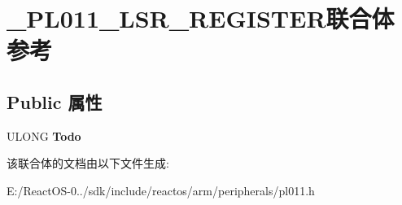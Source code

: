 \hypertarget{union___p_l011___l_s_r___r_e_g_i_s_t_e_r}{}\section{\+\_\+\+P\+L011\+\_\+\+L\+S\+R\+\_\+\+R\+E\+G\+I\+S\+T\+E\+R联合体 参考}
\label{union___p_l011___l_s_r___r_e_g_i_s_t_e_r}
\subsection*{Public 属性}
\begin{DoxyCompactItemize}
\item 
\mbox{\label{union___p_l011___l_s_r___r_e_g_i_s_t_e_r_abe5ddd438505134a40f8d96b85121261}} 
U\+L\+O\+NG {\bfseries Todo}
\end{DoxyCompactItemize}


该联合体的文档由以下文件生成\+:\begin{DoxyCompactItemize}
\item 
E\+:/\+React\+O\+S-\/0../sdk/include/reactos/arm/peripherals/pl011.\+h\end{DoxyCompactItemize}
